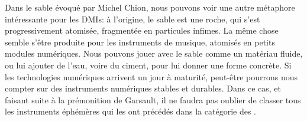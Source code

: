 \indent Dans le sable évoqué par Michel Chion, nous pouvons voir une autre métaphore intéressante pour les \glspl{DMI}: à l'origine, le sable est une roche, qui s'est progressivement atomisée, fragmentée en particules infimes. La même chose semble s'être produite pour les instruments de musique, atomisés en petits modules numériques. Nous pouvons jouer avec le sable comme un matériau fluide, ou lui ajouter de l'eau, voire du ciment, pour lui donner une forme concrète. Si les technologies numériques arrivent un jour à maturité, peut-être pourrons nous compter sur des instruments numériques stables et durables. Dans ce cas, et faisant suite à la prémonition de Garsault, il ne faudra pas oublier de classer tous les instruments éphémères qui les ont précédés dans la catégorie des .





